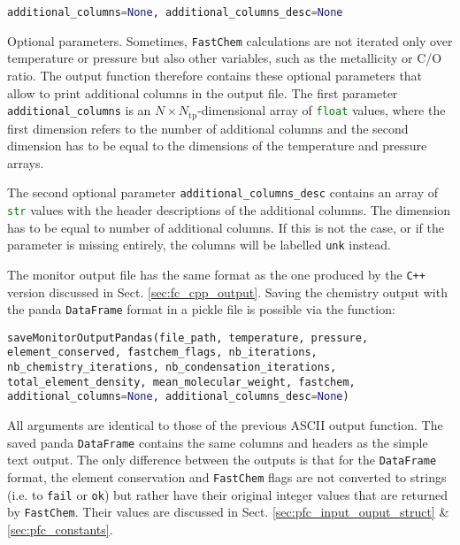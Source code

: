 \documentclass[numbers=noenddot]{aux/fcmanual}
\newcommand{\fc}{\texttt{FastChem}\xspace}
\newcommand{\cpp}{\ttt{C++}\xspace}
\newcommand{\ttt}[1]{\texttt {#1}}
\begin{document}
\lstinline[language=Python]!additional_columns=None, additional_columns_desc=None!
\begin{addmargin}[25pt]{0pt}
	Optional parameters. Sometimes, \fc calculations are not iterated only over temperature or pressure but also other variables, such as the metallicity or C/O ratio. The output function therefore contains these optional parameters that allow to print additional columns in the output file. The first parameter \lstinline[language=Python]!additional_columns! is an $N\times N_\mathrm{tp}$-dimensional array of \lstinline[language=Python]!float! values, where the first dimension refers to the number of additional columns and the second dimension has to be equal to the dimensions of the temperature and pressure arrays. 
	
	The second optional parameter \lstinline[language=Python]!additional_columns_desc! contains an array of \lstinline[language=Python]!str! values with the header descriptions of the additional columns. The dimension has to be equal to number of additional columns. If this is not the case, or if the parameter is missing entirely, the columns will be labelled \texttt{unk} instead.
\end{addmargin}

\bigbreak

The monitor output file has the same format as the one produced by the \cpp version discussed in Sect. \ref{sec:fc_cpp_output}. Saving the chemistry output with the panda \lstinline[language=Python]!DataFrame! format in a pickle file is possible via the function:

\bigbreak

\lstinline[language=Python, breaklines, breakatwhitespace]!saveMonitorOutputPandas(file_path, temperature, pressure, element_conserved, fastchem_flags, nb_iterations, nb_chemistry_iterations, nb_condensation_iterations, total_element_density, mean_molecular_weight, fastchem, additional_columns=None, additional_columns_desc=None)!

\bigbreak

All arguments are identical to those of the previous ASCII output function. The saved panda \lstinline[language=Python]!DataFrame! contains the same columns and headers as the simple text output. The only difference between the outputs is that for the \lstinline[language=Python]!DataFrame! format, the element conservation and \fc flags are not converted to strings (i.e. to \texttt{fail} or \texttt{ok}) but rather have their original integer values that are returned by \fc. Their values are discussed in Sect. \ref{sec:pfc_input_ouput_struct}  \& \ref{sec:pfc_constants}.
\end{document}

